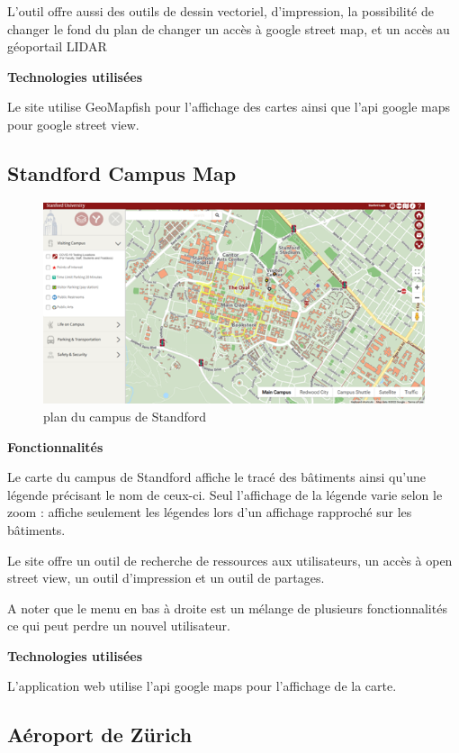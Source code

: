 \documentclass[
    iai, %
    il, %
]{heig-tb}
\begin{document}
L'outil offre aussi des outils de dessin vectoriel, d'impression, la possibilité de changer le fond du plan de changer un accès à google street map, et un accès au géoportail LIDAR

\textbf{Technologies utilisées}

Le site utilise GeoMapfish pour l'affichage des cartes ainsi que l'api google maps pour google street view.

\subsection{Standford Campus Map}

\begin{figure}[H]
    \caption{plan du campus de Standford}
    \centering
    \includegraphics{standfordCampusMap.png}
\end{figure}

\textbf{Fonctionnalités}

Le carte du campus de Standford \cite{standford-map} affiche le tracé des bâtiments ainsi qu'une légende précisant le nom de ceux-ci.
Seul l'affichage de la légende varie selon le zoom : affiche seulement les légendes lors d'un affichage rapproché sur les bâtiments.

Le site offre un outil de recherche de ressources aux utilisateurs, un accès à open street view, un outil d'impression et un outil de partages.

A noter que le menu en bas à droite est un mélange de plusieurs fonctionnalités ce qui peut perdre un nouvel utilisateur.

\textbf{Technologies utilisées}

L'application web utilise l'api google maps pour l'affichage de la carte.

\subsection{Aéroport de Zürich}
\end{document}
